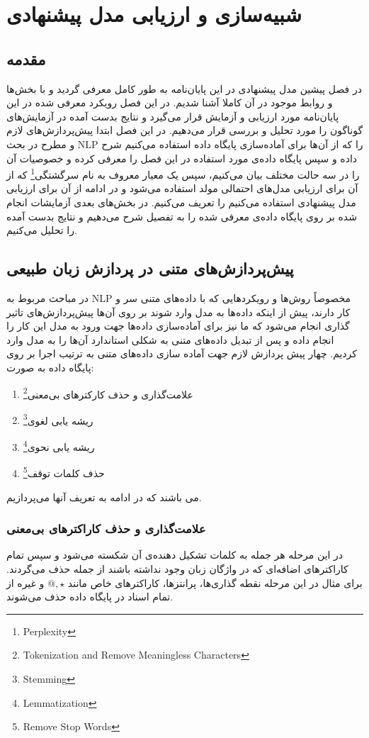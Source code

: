 \chapter{شبیه‌سازی و ارزیابی مدل پیشنهادی}
\label{chap5}
\thispagestyle{empty}
\section{مقدمه}
\label{chap5sec1}
در فصل پیشین مدل پیشنهادی در این پایان‌‌نامه به طور کامل معرفی‌ گردید و با بخش‌ها و روابط موجود در آن کاملا آشنا شدیم. در این فصل رویکرد معرفی‌ شده در این پایان‌‌نامه مورد  ارزیابی و آزمایش قرار می‌‌گیرد و نتایج بدست آمده در آزمایش‌های گوناگون را مورد تحلیل و بررسی‌ قرار می‌‌دهیم. در این فصل ابتدا پیش‌پردازش‌های لازم و مطرح در بحث 
NLP
را که از آن‌ها برای آماده‌سازی پایگاه داده استفاده می‌کنیم شرح داده و سپس پایگاه داده‌ی مورد استفاده در این فصل را معرفی کرده و خصوصیات آن را در سه‌ حالت مختلف بیان می‌‌کنیم، سپس یک معیار معروف به نام سرگشتگی\footnote{Perplexity}
که از آن برای ارزیابی مدل‌های احتمالی‌ مولد استفاده می‌شود و در ادامه از آن برای ارزیابی مدل پیشنهادی استفاده می‌‌کنیم را تعریف می‌‌کنیم. در بخش‌های بعدی آزمایشات انجام شده بر روی پایگاه داد‌ه‌ی معرفی‌ شده را به تفصیل شرح می‌‌دهیم و نتایج بدست آمده را تحلیل می‌‌کنیم.

\section{پیش‌پردازش‌های متنی در پردازش زبان طبیعی}
\label{chap5sec2}
در مباحث مربوط به
NLP
مخصوصاً روش‌ها و رویکردهایی که با داده‌های متنی سر و کار دارند، پیش از اینکه داده‌ها به مدل وارد شوند بر روی آن‌ها پیش‌پردازش‌های تاثیر گذاری انجام می‌‌شود که ما نیز برای آماده‌سازی داده‌ها جهت ورود به مدل این کار را انجام داده و پس از تبدیل داده‌های متنی به شکلی‌ استاندارد آن‌ها را به مدل وارد کردیم. چهار پیش پردازش لازم جهت آماده سازی داده‌های متنی به ترتیب اجرا بر روی پایگاه داده به صورت:
\begin{enumerate}
	\item علامت‌گذاری و حذف کارکترهای بی‌معنی\footnote{Tokenization and Remove Meaningless Characters}
	\item ریشه یابی لغوی\footnote{Stemming}
	\item ریشه یابی نحوی\footnote{Lemmatization}
	\item حذف کلمات توقف\footnote{Remove Stop Words}
\end{enumerate}
می‌ باشند که در ادامه به تعریف آنها می‌‌پردازیم.
\subsection{علامت‌گذاری و حذف کاراکترهای بی‌معنی‌}
\label{chap5sec2sub1}
در این مرحله هر جمله به کلمات تشکیل دهنده‌ی آن شکسته می‌‌شود و سپس تمام کاراکترهای اضافه‌ای ‌که در واژگان زبان وجود نداشته باشند از جمله حذف می‌‌گردند. برای مثال در این مرحله نقطه گذاری‌ها، پرانتزها، کاراکتر‌های خاص مانند
$@,  \star $
و غیره از تمام اسناد در پایگاه داده حذف می‌‌شوند.

